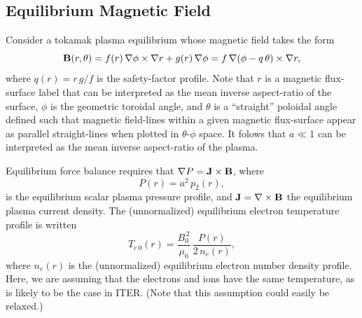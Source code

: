 \documentclass{iopjournal}
\begin{document}
{\subsection{Equilibrium Magnetic Field}\label{equilb}
Consider a tokamak plasma equilibrium whose magnetic field takes the form
\begin{equation}\label{bfield}
{\bf B}(r,\theta) = f(r)\,\nabla\phi\times \nabla r + g(r)\,\nabla\phi = f\,\nabla(\phi-q\,\theta)\times \nabla r,
\end{equation}
where
$q(r) = r\,g/f$ is the safety-factor profile. Note that $r$ is a magnetic flux-surface label that can be interpreted as  the mean inverse aspect-ratio of the surface,   $\phi$ is the geometric toroidal angle, and $\theta$ is a ``straight'' poloidal angle defined such that
magnetic field-lines within a given magnetic flux-surface appear as parallel straight-lines when plotted in $\theta$-$\phi$ space. 
It folows that $a\ll 1$ can be interpreted as  the mean inverse aspect-ratio of the plasma.

Equilibrium force balance requires that
$ \nabla P={\bf J}\times {\bf B}$, 
where 
\begin{equation}\label{ep2def}
P(r)= a^2\,p_2(r),
\end{equation}
 is the equilibrium scalar plasma pressure profile, and ${\bf J}=\nabla\times {\bf B}$ the equilibrium plasma current density. 
 The (unnormalized) equilibrium electron temperature profile is written
 \begin{equation}
 T_{e\,0}(r) = \frac{B_0^{\,2}}{\mu_0}\,\frac{P(r)}{2\,n_e(r)},
 \end{equation}
 where $n_e(r)$ is the (unnormalized) equilibrium electron number density profile. Here, we are assuming that the electrons and ions have the same
 temperature, as is likely to be the case in ITER. (Note that this assumption could easily be relaxed.) 

}
\end{document}
